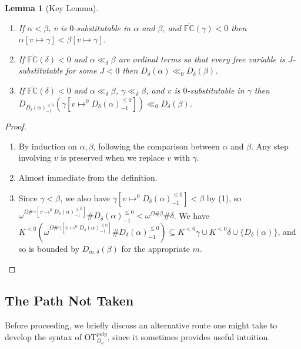 \documentclass[11pt]{amsart}
\newtheorem{lemma}[theorem]{Lemma}
\theoremstyle{definition}
\begin{document}
\begin{lemma}[Key Lemma]\ 
  \begin{enumerate}
  \item If $\alpha<\beta$, $v$ is $0$-substitutable in $\alpha$ and $\beta$, and $\overline{\mathbb{FC}}(\gamma)<0$ then $\alpha[v\mapsto\gamma]<\beta[v\mapsto\gamma]$.
  \item If $\overline{\mathbb{FC}}(\delta)<0$ and $\alpha\ll_\delta\beta$ are ordinal terms so that every free variable is $J$-substitutable for some $J<0$ then $D_{\delta}(\alpha)\ll_0 D_\delta(\beta)$.
  \item If $\overline{\mathbb{FC}}(\delta)<0$ and $\alpha\ll_\delta\beta$, $\gamma\ll_\delta\beta$, and $v$ is $0$-substitutable in $\gamma$ then $D_{D_\delta(\alpha)^{\leq 0}_{-1}}(\gamma[v\mapsto^0 D_\delta(\alpha)^{\leq 0}_{-1}])\ll_0 D_\delta(\beta)$.
  \end{enumerate}
\end{lemma}
\begin{proof}
  \begin{enumerate}
  \item  By induction on $\alpha,\beta$, following the comparison between $\alpha$ and $\beta$. Any step involving $v$ is preserved when we replace $v$ with $\gamma$.

  \item  Almost immediate from the definition.
    
  \item  Since $\gamma<\beta$, we also have $\gamma[v\mapsto^0 D_\delta(\alpha)^{\leq 0}_{-1}]<\beta$ by (1), so $\omega^{\Omega\#\gamma[v\mapsto^0 D_\delta(\alpha)^{\leq 0}_{-1}]}\#D_\delta(\alpha)^{\leq 0}_{-1}<\omega^{\Omega\#\beta}\#\delta$. We have $K^{<0}(\omega^{\Omega\#\gamma[v\mapsto^0 D_\delta(\alpha)^{\leq 0}_{-1}]}\#D_\delta(\alpha)^{\leq 0}_{-1})\subseteq K^{<0}\gamma\cup K^{<0}\delta\cup \{D_\delta(\alpha)\}$, and so is bounded by $D_{m,\delta}(\beta)$ for the appropriate $m$.
  \end{enumerate}
\end{proof}

\subsection{The Path Not Taken}\label{sec:not_taken}

Before proceeding, we briefly discuss an alternative route one might take to develop the syntax of $\mathrm{OT}^{poly}_{\Omega_\omega}$, since it sometimes provides useful intuition.
\end{document}
